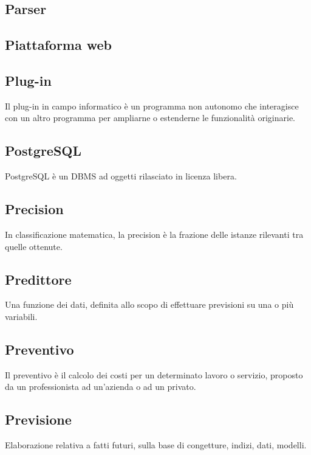 
\subsection*{Parser}

\subsection*{Piattaforma web}

\subsection*{Plug-in}
Il plug-in in campo informatico è un programma non autonomo che interagisce con un altro programma per ampliarne o estenderne le funzionalità originarie.

\subsection*{PostgreSQL}
PostgreSQL è un DBMS ad oggetti rilasciato in licenza libera.

\subsection*{Precision}
In classificazione matematica, la precision è la frazione delle istanze rilevanti tra quelle ottenute.

\subsection*{Predittore}
Una funzione dei dati, definita allo scopo di effettuare previsioni su una o più variabili.

\subsection*{Preventivo}
Il preventivo è il calcolo dei costi per un determinato lavoro o servizio, proposto da un professionista ad un'azienda o ad un privato.

\subsection*{Previsione}
Elaborazione relativa a fatti futuri, sulla base di congetture, indizi, dati, modelli.

